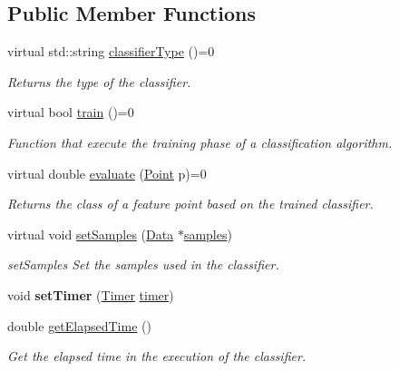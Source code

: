 \subsection*{Public Member Functions}
\begin{DoxyCompactItemize}
\item 
virtual std\+::string \hyperlink{class_classifier_a7bfe7cc88b851b4a7e7ec55b30dd844e}{classifier\+Type} ()=0
\begin{DoxyCompactList}\small\item\em Returns the type of the classifier. \end{DoxyCompactList}\item 
virtual bool \hyperlink{class_classifier_a2306a5de27555ab093593ac9642bc7d9}{train} ()=0
\begin{DoxyCompactList}\small\item\em Function that execute the training phase of a classification algorithm. \end{DoxyCompactList}\item 
virtual double \hyperlink{class_classifier_ae8e9554823b85ddc2dcad2955da811d9}{evaluate} (\hyperlink{class_point}{Point} p)=0
\begin{DoxyCompactList}\small\item\em Returns the class of a feature point based on the trained classifier. \end{DoxyCompactList}\item 
virtual void \hyperlink{class_classifier_a4b16736670cba8f4c8397b6a90c8c799}{set\+Samples} (\hyperlink{class_data}{Data} $\ast$\hyperlink{class_classifier_a515c225d0da93df02ca79f9f87811d17}{samples})
\begin{DoxyCompactList}\small\item\em set\+Samples Set the samples used in the classifier. \end{DoxyCompactList}\item 
\mbox{\label{class_classifier_aeadfa75f26ea79e525db5767a965da6e}} 
void {\bfseries set\+Timer} (\hyperlink{class_timer}{Timer} \hyperlink{class_classifier_ae9d28253495ae8807d586faff951d46f}{timer})
\item 
double \hyperlink{class_classifier_ab47b67b061041193aa3ae2a7856f4980}{get\+Elapsed\+Time} ()
\begin{DoxyCompactList}\small\item\em Get the elapsed time in the execution of the classifier. \end{DoxyCompactList}\item 

\end{DoxyCompactItemize}
